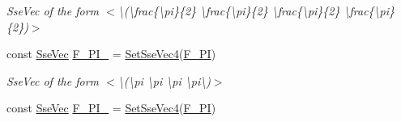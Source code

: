 \begin{DoxyCompactItemize}
\begin{DoxyCompactList}\small\item\em Sse\+Vec of the form $<$\textbackslash{}(\textbackslash{}frac\{\textbackslash{}pi\}\{2\} \textbackslash{}frac\{\textbackslash{}pi\}\{2\} \textbackslash{}frac\{\textbackslash{}pi\}\{2\} \textbackslash{}frac\{\textbackslash{}pi\}\{2\})$>$ \end{DoxyCompactList}\item 
\hypertarget{namespacegfxmath_a9282b3367db2aaa0a821aec0a49db6e8}{}const \hyperlink{namespacegfxmath_a0de2243e2b8d0fd46d3af5e036423004}{Sse\+Vec} \hyperlink{namespacegfxmath_a9282b3367db2aaa0a821aec0a49db6e8}{F\+\_\+\+P\+I\+\_} = \hyperlink{namespacegfxmath_a3b21a4362c6ac781c5f6ab922840ba77}{Set\+Sse\+Vec4}(\hyperlink{group___scalar_math_consts_ga2c19b1c00458d0f6bd454617b337d468}{F\+\_\+\+P\+I})\label{namespacegfxmath_a9282b3367db2aaa0a821aec0a49db6e8}

\begin{DoxyCompactList}\small\item\em Sse\+Vec of the form $<$\textbackslash{}(\textbackslash{}pi \textbackslash{}pi \textbackslash{}pi \textbackslash{}pi\textbackslash{})$>$ \end{DoxyCompactList}\item 
\hypertarget{namespacegfxmath_a0242155348bcf78af6f9471724263460}{}const \hyperlink{namespacegfxmath_a0de2243e2b8d0fd46d3af5e036423004}{Sse\+Vec} \hyperlink{namespacegfxmath_a0242155348bcf78af6f9471724263460}{F\+\_\+P\+I\+\_} = \hyperlink{namespacegfxmath_a3b21a4362c6ac781c5f6ab922840ba77}{Set\+Sse\+Vec4}(\hyperlink{group___scalar_math_consts_gac6cbd226e329cad09f1bab1504203fec}{F\+\_\+P\+I})\label{namespacegfxmath_a0242155348bcf78af6f9471724263460}


\end{DoxyCompactItemize}
